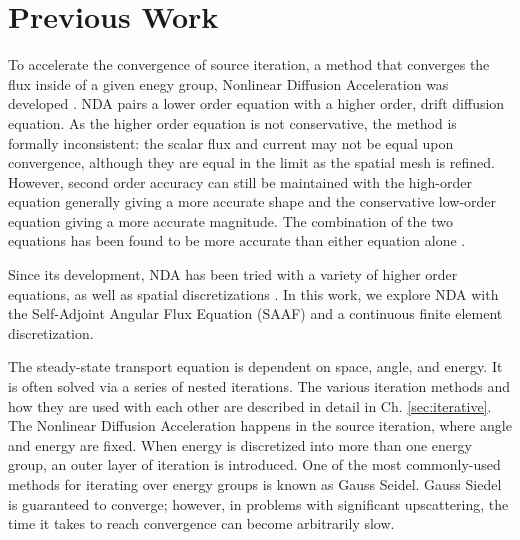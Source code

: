 
\section{Previous Work}
To accelerate the convergence of source iteration, a method that converges the flux inside of a given enegy group, Nonlinear Diffusion Acceleration was developed \cite{Knoll2011} \cite{park-nda}. 
NDA pairs a lower order equation with a higher order, drift diffusion equation. 
As the higher order equation is not conservative, the method is formally inconsistent: the scalar flux and current may not be equal upon convergence,
although they are equal in the limit as the spatial mesh is refined. However, second order accuracy
 can still be maintained with the high-order equation generally giving a more accurate shape and the conservative low-order equation giving a more accurate magnitude.
 The combination of the two equations has been found to be more accurate than either equation alone \cite{morel-holo}.
 
Since its development, NDA has been tried with a variety of higher order equations, \cite{morel-holo}\cite{Wang2013} as well as spatial discretizations \cite{morel-holo}\cite{Schunert2017}. In this work, we explore NDA with the Self-Adjoint Angular Flux Equation (SAAF) and a continuous finite element discretization.

The steady-state transport equation is dependent on space, angle, and energy. It is often solved via a series of nested iterations. The various iteration methods and how they are used with each other are described in detail in Ch. \ref{sec:iterative}. The Nonlinear Diffusion Acceleration happens in the source iteration, where angle and energy are fixed. When energy is discretized into more than one energy group, an outer layer of iteration is introduced. One of the most commonly-used methods for iterating over energy groups is known as Gauss Seidel. Gauss Siedel is guaranteed to converge; however, in problems with significant upscattering, the time it takes to reach convergence can become arbitrarily slow. 

